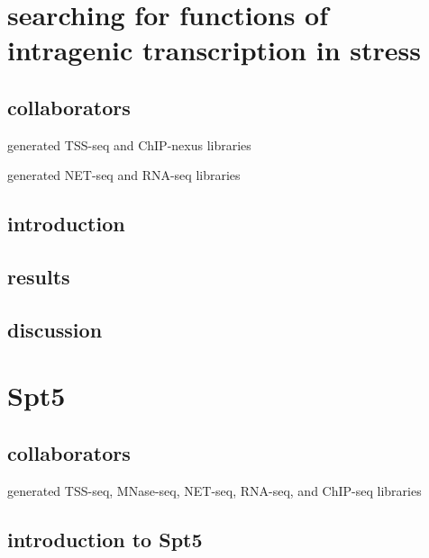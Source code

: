 \documentclass[10pt, letterpaper]{article}
\begin{document}
\pagebreak
\section{searching for functions of intragenic transcription in stress}

\subsection{collaborators}

\begin{description}[align=right, labelwidth=5cm, noitemsep]
    \item [Steve Doris] generated TSS-seq and ChIP-nexus libraries
    \item [Blake Tye] generated NET-seq and RNA-seq libraries
\end{description}

\subsection{introduction}
\subsection{results}
\subsection{discussion}

\pagebreak

\section{Spt5}

\subsection{collaborators}

\begin{description}[align=right, labelwidth=5cm, noitemsep]
    \item [Ameet Shetty] generated TSS-seq, MNase-seq, NET-seq, RNA-seq, and ChIP-seq libraries
\end{description}

\subsection{introduction to Spt5}
\end{document}
